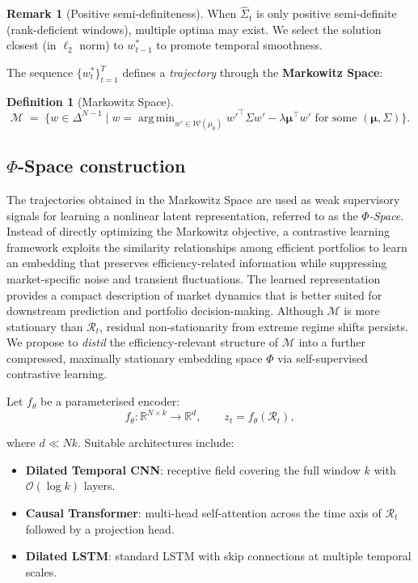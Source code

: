 \documentclass[preprint,12pt]{elsarticle}
\theoremstyle{plain}
\theoremstyle{definition}
\newtheorem{definition}[theorem]{Definition}
\newtheorem{remark}[theorem]{Remark}
\newcommand{\R}{\mathbb{R}}
\newcommand{\calM}{\mathcal{M}}
\newcommand{\calR}{\mathcal{R}}
\newcommand{\calW}{\mathcal{W}}
\newcommand{\bmu}{\bm{\mu}}
\DeclareMathOperator*{\argmin}{arg\,min}
\begin{document}
\begin{remark}[Positive semi-definiteness]
	When $\hat{\Sigma}_t$ is only positive semi-definite (rank-deficient windows),
	multiple optima may exist.  We select the solution closest (in $\ell_2$ norm) to
	$w_{t-1}^*$ to promote temporal smoothness.
\end{remark}

The sequence $\{w_t^*\}_{t=1}^T$ defines a \emph{trajectory} through the
\textbf{Markowitz Space}:
\begin{definition}[Markowitz Space]
	\[
	\calM \;=\; \bigl\{ w \in \Delta^{N-1} \;\big|\;
	w = \argmin_{w'\in\calW(\mu_0)} w'^\top\Sigma w' - \lambda\bmu^\top w'
	\text{ for some } (\bmu,\Sigma) \bigr\}.
	\]
\end{definition}

\subsection{{$\Phi$-Space} construction}
The trajectories obtained in the Markowitz Space are used as weak supervisory signals for learning a nonlinear latent representation, referred to as the \emph{$\Phi$-Space}. Instead of directly optimizing the Markowitz objective, a contrastive learning framework exploits the similarity relationships among efficient portfolios to learn an embedding that preserves efficiency-related information while suppressing market-specific noise and transient fluctuations. The learned representation provides a compact description of market dynamics that is better suited for downstream prediction and portfolio decision-making.
Although $\calM$ is more stationary than $\calR_t$, residual non-stationarity
from extreme regime shifts persists.  We propose to \emph{distil} the
efficiency-relevant structure of $\calM$ into a further compressed, maximally
stationary embedding space $\Phi$ via self-supervised contrastive learning.

Let $f_\theta$ be a parameterised encoder:
\begin{equation}
	f_\theta : \R^{N \times k} \to \R^d, \qquad z_t = f_\theta(\calR_t),
	\label{eq:encoder}
\end{equation}

where $d \ll Nk$.  Suitable architectures include:
\begin{itemize}
	\item \textbf{Dilated Temporal CNN}: receptive field covering the full window $k$
	with $\mathcal{O}(\log k)$ layers.
	\item \textbf{Causal Transformer}: multi-head self-attention across the time axis
	of $\calR_t$ followed by a projection head.
	\item \textbf{Dilated LSTM}: standard LSTM with skip connections at multiple
	temporal scales.
\end{itemize}
\end{document}
